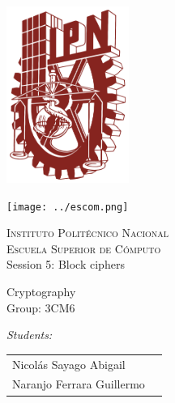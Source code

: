 \documentclass[12pt]{article}
\author{Reporte 1}
\begin{document}
		\begin{titlepage}
			\begin{center}
				
				
				\noindent
				\begin{minipage}{0.5\textwidth}
					\begin{flushleft} \large
						\includegraphics[width=0.3\textwidth]{../ipn.png}
					\end{flushleft}
				\end{minipage}%
				\begin{minipage}{0.55\textwidth}
					\begin{flushright} \large
						\texttt{[image: ../escom.png]}
					\end{flushright}
				\end{minipage}
				
				\textsc{\LARGE Instituto Politécnico Nacional}\\[0.5cm]
				
				\textsc{\Large Escuela Superior de Cómputo}\\[1cm]
				
				
				{ \huge Session 5: Block ciphers \\[1cm] }
				
				{ \Large Cryptography} \\[1cm]
				
				{ \Large Group: 3CM6 } \\[1cm]
				
				\noindent
				\begin{minipage}{0.5\textwidth}
					\begin{flushleft} \large
						\emph{Students:}\\
						
						\begin{tabular}{ll}
					     Nicolás Sayago Abigail\\
					     Naranjo Ferrara Guillermo\\
					     

\end{tabular}
\end{flushleft}
\end{minipage}
\end{center}
\end{titlepage}
\end{document}
